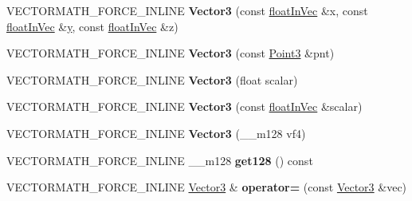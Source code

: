 \begin{DoxyCompactItemize}
\item 
\hypertarget{class_vectormath_1_1_aos_1_1_vector3_a874d7dcc3d4a96d00811606f9e6fc701}{V\+E\+C\+T\+O\+R\+M\+A\+T\+H\+\_\+\+F\+O\+R\+C\+E\+\_\+\+I\+N\+L\+I\+N\+E {\bfseries Vector3} (const \hyperlink{class_vectormath_1_1float_in_vec}{float\+In\+Vec} \&x, const \hyperlink{class_vectormath_1_1float_in_vec}{float\+In\+Vec} \&\hyperlink{_ice_utils_8h_aa7ffaed69623192258fb8679569ff9ba}{y}, const \hyperlink{class_vectormath_1_1float_in_vec}{float\+In\+Vec} \&z)}\label{class_vectormath_1_1_aos_1_1_vector3_a874d7dcc3d4a96d00811606f9e6fc701}

\item 
\hypertarget{class_vectormath_1_1_aos_1_1_vector3_a5c4725284242af1e99b5ab244c03ad2e}{V\+E\+C\+T\+O\+R\+M\+A\+T\+H\+\_\+\+F\+O\+R\+C\+E\+\_\+\+I\+N\+L\+I\+N\+E {\bfseries Vector3} (const \hyperlink{class_vectormath_1_1_aos_1_1_point3}{Point3} \&pnt)}\label{class_vectormath_1_1_aos_1_1_vector3_a5c4725284242af1e99b5ab244c03ad2e}

\item 
\hypertarget{class_vectormath_1_1_aos_1_1_vector3_aa64785a6836fa840d949fecd6d419721}{V\+E\+C\+T\+O\+R\+M\+A\+T\+H\+\_\+\+F\+O\+R\+C\+E\+\_\+\+I\+N\+L\+I\+N\+E {\bfseries Vector3} (float scalar)}\label{class_vectormath_1_1_aos_1_1_vector3_aa64785a6836fa840d949fecd6d419721}

\item 
\hypertarget{class_vectormath_1_1_aos_1_1_vector3_a417c78c1d67cbdb9a1d25b491b869363}{V\+E\+C\+T\+O\+R\+M\+A\+T\+H\+\_\+\+F\+O\+R\+C\+E\+\_\+\+I\+N\+L\+I\+N\+E {\bfseries Vector3} (const \hyperlink{class_vectormath_1_1float_in_vec}{float\+In\+Vec} \&scalar)}\label{class_vectormath_1_1_aos_1_1_vector3_a417c78c1d67cbdb9a1d25b491b869363}

\item 
\hypertarget{class_vectormath_1_1_aos_1_1_vector3_a2e444557932c1115952cc60231913e7e}{V\+E\+C\+T\+O\+R\+M\+A\+T\+H\+\_\+\+F\+O\+R\+C\+E\+\_\+\+I\+N\+L\+I\+N\+E {\bfseries Vector3} (\+\_\+\+\_\+m128 vf4)}\label{class_vectormath_1_1_aos_1_1_vector3_a2e444557932c1115952cc60231913e7e}

\item 
\hypertarget{class_vectormath_1_1_aos_1_1_vector3_a5ab1eb6cffbecc05b1d04028e2342601}{V\+E\+C\+T\+O\+R\+M\+A\+T\+H\+\_\+\+F\+O\+R\+C\+E\+\_\+\+I\+N\+L\+I\+N\+E \+\_\+\+\_\+m128 {\bfseries get128} () const }\label{class_vectormath_1_1_aos_1_1_vector3_a5ab1eb6cffbecc05b1d04028e2342601}

\item 
\hypertarget{class_vectormath_1_1_aos_1_1_vector3_adeff486f351f2d8b5df32418700d7889}{V\+E\+C\+T\+O\+R\+M\+A\+T\+H\+\_\+\+F\+O\+R\+C\+E\+\_\+\+I\+N\+L\+I\+N\+E \hyperlink{class_vectormath_1_1_aos_1_1_vector3}{Vector3} \& {\bfseries operator=} (const \hyperlink{class_vectormath_1_1_aos_1_1_vector3}{Vector3} \&vec)}\label{class_vectormath_1_1_aos_1_1_vector3_adeff486f351f2d8b5df32418700d7889}


\end{DoxyCompactItemize}
